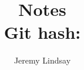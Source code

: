 \documentclass[oneside]{book}
\title{%
Notes\\
\large Git hash:\\
}
\author{Jeremy Lindsay}
\date{}
\begin{document}
\maketitle

\newpage

\tableofcontents

\sloppy


%
%

\printbibliography
\end{document}
